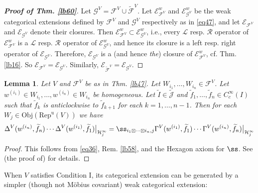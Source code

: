 \documentclass[11pt,b5paper,notitlepage]{article}
\theoremstyle{definition}
\theoremstyle{plain}
\newtheorem{lm}[df]{Lemma}
\newcommand{\mc}{\mathcal}
\newcommand{\wtd}{\widetilde}
\newcommand{\uni}{\mathrm{u}}
\newcommand{\scr}{\mathscr}
\newcommand{\Jtd}{\widetilde{\mathcal J}}
\newcommand{\RepV}{{\mathrm{Rep}^\uni(V)}}
\newcommand{\Obj}{\mathrm{Obj}}
\numberwithin{equation}{section}
\begin{document}
\begin{proof}[\textbf{Proof of Thm. \ref{lb60}}]
Let $\mc G^V=\mc F^V\cup\wtd{\mc F}^V$. Let $\scr E^w_{\mc F^V}$ and $\scr E^w_{\mc G^V}$ be the weak categorical extensions defined by $\mc F^V$ and $\mc G^V$ respectively as in \eqref{eq47}, and let $\scr E_{\mc F^V}$ and $\scr E_{\mc G^V}$ denote their closures. Then $\scr E^w_{\mc F^V}\subset \scr E^w_{\mc G^V}$, i.e., every $\mc L$ resp. $\mc R$ operator of $\scr E^w_{\mc F^V}$ is a $\mc L$ resp. $\mc R$ operator of $\scr E^w_{\mc G^V}$, and hence its closure is a left resp. right operator of $\scr E_{\mc G^V}$. Therefore, $\scr E_{\mc G^V}$ is a (and hence \textit{the}) closure of $\scr E^w_{\mc F^V}$, cf. Thm. \ref{lb16}. So $\scr E_{\mc F^V}=\scr E_{\mc G^V}$. Similarly, $\scr E_{\wtd{\mc F}^V}=\scr E_{\mc G^V}$.
\end{proof}


\begin{lm}\label{lb59}
Let $V$ and $\mc F^V$ be as in Thm. \ref{lb47}. Let $W_{i_1},\dots,W_{i_n}\in\mc F^V$. Let $w^{(i_1)}\in W_{i_1},\dots,w^{(i_n)}\in W_{i_n}$ be homogeneous. Let $\wtd I\in\Jtd$ and $\wtd f_1,\dots,\wtd f_n\in C_c^\infty(I)$ such that $\wtd f_k$ is anticlockwise to $\wtd f_{k+1}$ for each $k=1,\dots,n-1$. Then for each $W_j\in\Obj(\RepV)$ we have
\begin{align}
\Delta^V(w^{(i_n)},\wtd f_n)\cdots \Delta^V(w^{(i_1)},\wtd f_1)\big|_{\mc H_j^\infty}=\ss_{i_1\boxdot\cdots\boxdot i_n,j}\Gamma^V(w^{(i_1)},\wtd f_1)\cdots \Gamma^V(w^{(i_n)},\wtd f_n)\big|_{\mc H_j^\infty}
\end{align}
\end{lm}

\begin{proof}
This follows from \eqref{eq36}, Rem. \ref{lb58}, and the Hexagon axiom for $\ss$. See (the proof of) \cite[Prop. 1.7.3]{Gui20} for details.
\end{proof}



When $V$ satisfies Condition I, its categorical extension can be generated by a simpler (though not M\"obius covariant) weak categorical extension:
\end{document}
